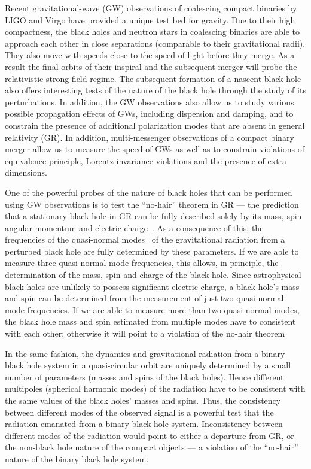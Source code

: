 \documentclass[prd,preprintnumbers,twocolumn,eqsecnum,floatfix,a4paper,nofootinbib,superscriptaddress]{revtex4}
\begin{document}
Recent gravitational-wave (GW) observations of coalescing compact binaries by LIGO and Virgo have provided a unique test bed for gravity. Due to their high compactness, the black holes and neutron stars in coalescing binaries are able to approach each other in close separations (comparable to their gravitational radii). They also move with speeds close to the speed of light before they merge. As a result the final orbits of their inspiral and the subsequent merger will probe the relativistic strong-field regime. The subsequent formation of a nascent black hole also offers interesting tests of the nature of the black hole through the study of its perturbations. In addition, the GW observations also allow us to study various possible propagation effects of GWs, including dispersion and damping, and to constrain the presence of additional polarization modes that are absent in general relativity (GR). In addition, multi-messenger observations of a compact binary merger allow us to measure the speed of GWs as well as to constrain violations of equivalence principle, Lorentz invariance violations and the presence of extra dimensions. 

One of the powerful probes of the nature of black holes that can be performed using GW observations is to test the ``no-hair'' theorem in GR --- the prediction that a stationary black hole in GR can be fully described solely by its mass, spin angular momentum and electric charge~\cite{Israel:1967,Israel:1968,Carter:1978}. As a consequence of this, the frequencies of the {quasi-normal modes}~\cite{Vishveshwara:1970zz,Press:1971wr,Chandrasekhar:1975zza} of the gravitational radiation from a perturbed black hole are fully determined by these parameters. If we are able to measure three quasi-normal mode frequencies, this allows, in principle, the determination of the mass, spin and charge of the black hole. Since astrophysical black holes are unlikely to possess significant electric charge, a black hole's mass and spin can be determined from the measurement of just two quasi-normal mode frequencies. If we are able to measure more than two quasi-normal modes, the black hole mass and spin estimated from multiple modes have to consistent with each other; otherwise it will point to a violation of the no-hair theorem~\cite{Dreyer:2003bv}

In the same fashion, the dynamics and gravitational radiation from a binary black hole system in a quasi-circular orbit are uniquely determined by a small number of parameters (masses and spins of the black holes). Hence different multipoles (spherical harmonic modes) of the radiation have to be consistent with the same values of the black holes' masses and spins. Thus, the consistency between different modes of the observed signal is a powerful test that the radiation emanated from a binary black hole system. Inconsistency between different modes of the radiation would point to either a departure from GR, or the non-black hole nature of the compact objects --- a violation of the ``no-hair'' nature of the binary black hole system. 
\end{document}
